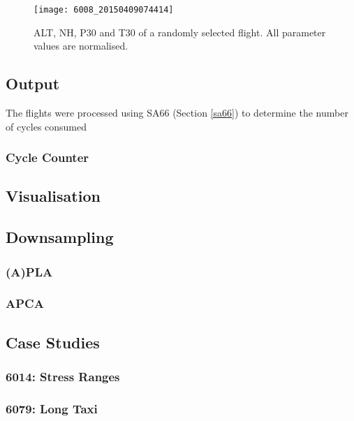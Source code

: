 \begin{figure}
    \centering
    \texttt{[image: 6008\_20150409074414]}
    \caption{\label{fig:flt_example} ALT, NH, P30 and T30 of a randomly selected flight. All parameter values are normalised.}
\end{figure}


\subsection{Output}
The flights were processed using SA66 (Section \ref{sa66}) to determine the number of cycles consumed

\subsubsection{Cycle Counter}

\subsection{Visualisation}

\subsection{Downsampling}

\subsubsection{(A)PLA}

\subsubsection{APCA}

\subsection{Case Studies}

\subsubsection{6014: Stress Ranges}

\subsubsection{6079: Long Taxi}